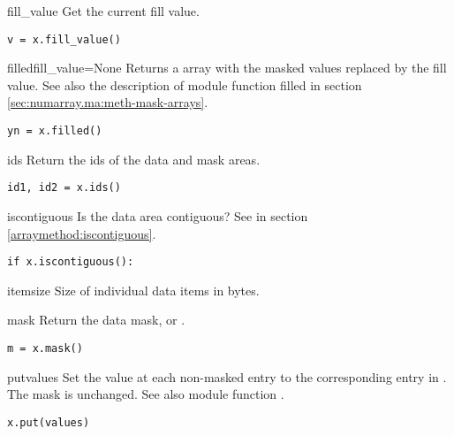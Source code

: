 \begin{methoddesc}[MaskedArray]{fill_value}{}
   Get the current fill value. 
\begin{verbatim}
v = x.fill_value()
\end{verbatim}
\end{methoddesc}

\begin{methoddesc}[MaskedArray]{filled}{fill_value=None}
   Returns a \module{\numarray} array with the masked values replaced by the
   fill value.  See also the description of module function filled in section
   \ref{sec:numarray.ma:meth-mask-arrays}.
\begin{verbatim}
yn = x.filled()
\end{verbatim}
\end{methoddesc}

\begin{methoddesc}[MaskedArray]{ids}{}
   Return the ids of the data and mask areas. 
\begin{verbatim}
id1, id2 = x.ids()
\end{verbatim}
\end{methoddesc}

\begin{methoddesc}[MaskedArray]{iscontiguous}{}
   Is the data area contiguous? See  in section
   \ref{arraymethod:iscontiguous}.
\begin{verbatim}
if x.iscontiguous():
\end{verbatim}
\end{methoddesc}

\begin{methoddesc}[MaskedArray]{itemsize}{}
   Size of individual data items in bytes. 
\end{methoddesc}

\begin{methoddesc}[MaskedArray]{mask}{}
   Return the data mask, or . 
\begin{verbatim}
m = x.mask()
\end{verbatim}
\end{methoddesc}

\begin{methoddesc}[MaskedArray]{put}{values}
   Set the value at each non-masked entry to the corresponding entry in
   . The mask is unchanged. See also module function
   . 
\begin{verbatim}
x.put(values)
\end{verbatim}
\end{methoddesc}

